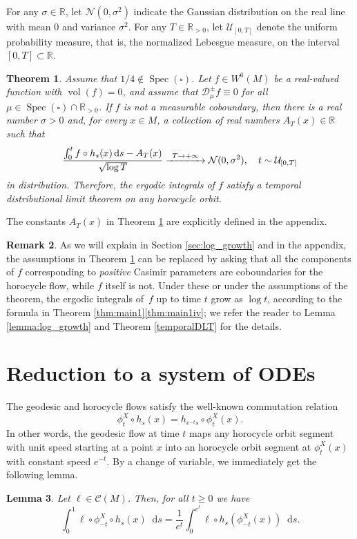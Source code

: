 \documentclass[10pt]{amsart}
\newcommand\To[1]{\mathchoice{\xrightarrow{\kern4pt#1\kern3pt}}{\stackrel{#1}{\longrightarrow}}{}{}}
\newcommand \R{\mathbb{R}}
\newcommand {\cN}{\mathcal{N}}
\newcommand*{\diff}{\mathop{}\!\mathrm{d}}
\newcommand{\Dpm}[1]{\mathcal{D}_\mu^{\pm} #1}
\DeclareMathOperator{\vol}{vol}
\DeclareMathOperator{\Spec}{Spec}
\newtheorem{theorem}{Theorem}
\newtheorem {lemma}[theorem]{Lemma}
\theoremstyle{definition}
\newtheorem{remark}[theorem]{Remark}
\begin{document}
For any $\sigma\in \R$, let $\cN(0,\sigma^{2})$ indicate the Gaussian distribution on the real line with mean $0$ and variance $\sigma^{2}$. For any $T\in \R_{>0}$, let $\mathcal{U}_{[0,T]}$ denote the uniform probability measure, that is, the normalized Lebesgue measure, on the interval $[0,T]\subset \R$.

\begin{theorem}\label{thm:main_DS}
Assume that $1/4 \notin \Spec(\square)$. Let $f \in W^6(M)$ be a real-valued function with $\vol(f)=0$, and assume that $\Dpm{f} \equiv 0$ for all $\mu \in \Spec(\square) \cap \R_{>0}$.
If $f$ is not a measurable coboundary, then there is a real number $\sigma>0$ and, for every $x \in M$, a collection of real numbers $A_T(x) \in \R$ such that
\[
\frac{\int_0^{t}f\circ h_s(x) \diff s - A_T(x)}{\sqrt{\log{T}}}\To{T\to+\infty}\cN(0,\sigma^{2}), \quad t\sim \mathcal{U}_{[0,T]}
\]
in distribution. Therefore, the ergodic integrals of $f$ satisfy a temporal distributional limit theorem on any horocycle orbit.
\end{theorem}

The constants $A_T(x)$ in Theorem \ref{thm:main_DS} are explicitly defined in the appendix.

\begin{remark}
As we will explain in Section \ref{sec:log_growth} and in the appendix, the assumptions in Theorem \ref{thm:main_DS} can be replaced by asking that all the components of $f$ corresponding to \emph{positive} Casimir parameters are coboundaries for the horocycle flow, while $f$ itself is not. Under these or under the assumptions of the theorem, the ergodic integrals of~$f$ up to time $t$ grow as $\log t$, according to the formula in Theorem \ref{thm:main1}\eqref{thm:main1iv}; we refer the reader to Lemma \ref{lemma:log_growth} and Theorem \ref{temporalDLT} for the details.
\end{remark}

\section{Reduction to a system of ODEs}\label{sec:reduction}

The geodesic and horocycle flows satisfy the well-known commutation relation
\[
\phi^X_t \circ h_s (x) = h_{e^{-t}s} \circ \phi^X_t(x).
\]
In other words, the geodesic flow at time $t$ maps any horocycle orbit segment with unit speed starting at a point $x$ into an horocycle orbit segment at $\phi^X_t(x)$ with constant speed $e^{-t}$.
By a change of variable, we immediately get the following lemma.
\begin{lemma}\label{lemma:c_o_v}
Let $\ell \in \mathscr{C}(M)$. Then, for all $t \geq 0$ we have
\[
\int_0^1 \ell \circ \phi^X_{-t}\circ h_s(x) \diff s = \frac{1}{e^t}\int_0^{e^t} \ell \circ h_s (\phi^X_{-t}(x)) \diff s.
\]
\end{lemma}
\end{document}
